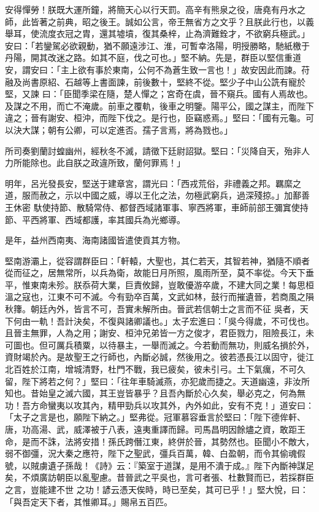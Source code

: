 \begin{pinyinscope}
 安得憚勞！朕既大運所鐘，將簡天心以行天罰。高辛有熊泉之役，唐堯有丹水之師，此皆著之前典，昭之後王。誠如公言，帝王無省方之文乎？且朕此行也，以義舉耳，使流度衣冠之胄，還其墟墳，復其桑梓，止為濟難銓才，不欲窮兵極武。」安曰：「若鑾駕必欲親動，猶不願遠涉江、淮，可暫幸洛陽，明授勝略，馳紙檄于丹陽，開其改迷之路。如其不庭，伐之可也。」堅不納。先是，群臣以堅信重道安，謂安曰：「主上欲有事於東南，公何不為蒼生致一言也！」故安因此而諫。苻融及尚書原紹、石越等上書面諫，前後數十，堅終不從。堅少子中山公詵有寵於堅，又諫
 曰：「臣聞季梁在隨，楚人憚之；宮奇在虞，晉不窺兵。國有人焉故也。及謀之不用，而亡不淹歲。前車之覆軌，後車之明鑒。陽平公，國之謀主，而陛下違之；晉有謝安、桓沖，而陛下伐之。是行也，臣竊惑焉。」堅曰：「國有元龜。可以決大謀；朝有公卿，可以定進否。孺子言焉，將為戮也。」



 所司奏劉蘭討蝗幽州，經秋冬不滅，請徵下廷尉詔獄。堅曰：「災降自天，殆非人力所能除也。此自朕之政違所致，蘭何罪焉！」



 明年，呂光發長安，堅送于建章宮，謂光曰：「西戎荒俗，非禮義之邦。羈縻之道，服而赦之，示以中國之威，導以王化之法，勿極武窮兵，過深殘掠。」加鄯善王休密
 馱使持節、散騎常侍、都督西域諸軍事、寧西將軍，車師前部王彌窴使持節、平西將軍、西域都護，率其國兵為光鄉導。



 是年，益州西南夷、海南諸國皆遣使貢其方物。



 堅南游灞上，從容謂群臣曰：「軒轅，大聖也，其仁若天，其智若神，猶隨不順者從而征之，居無常所，以兵為衛，故能日月所照，風雨所至，莫不率從。今天下垂平，惟東南未殄。朕忝荷大業，巨責攸歸，豈敢優游卒歲，不建大同之業！每思桓溫之寇也，江東不可不滅。今有勁卒百萬，文武如林，鼓行而摧遺晉，若商風之隕秋籜。朝廷內外，皆言不可，吾實未解所由。晉武若信朝士之言而不征
 吳者，天下何由一軌！吾計決矣，不復與諸卿議也。」太子宏進曰：「吳今得歲，不可伐也。且晉主無罪，人為之用；謝安、桓沖兄弟皆一方之俊才，君臣戮力，阻險長江，未可圖也。但可厲兵積粟，以待暴主，一舉而滅之。今若動而無功，則威名損於外，資財竭於內。是故聖王之行師也，內斷必誠，然後用之。彼若憑長江以固守，徙江北百姓於江南，增城清野，杜門不戰，我已疲矣，彼未引弓。土下氣癘，不可久留，陛下將若之何？」堅曰：「往年車騎滅燕，亦犯歲而捷之。天道幽遠，非汝所知也。昔始皇之滅六國，其王豈皆暴乎？且吾內斷於心久矣，舉必克之，何為無
 功！吾方命蠻夷以攻其內，精甲勁兵以攻其外，內外如此，安有不克！」道安曰：「太子之言是也，願陛下納之。」堅弗從。冠軍慕容垂言於堅曰：「陛下德侔軒、唐，功高湯、武，威澤被于八表，遠夷重譯而歸。司馬昌明因餘燼之資，敢距王命，是而不誅，法將安措！孫氏跨僭江東，終併於晉，其勢然也。臣聞小不敵大，弱不御彊，況大秦之應符，陛下之聖武，彊兵百萬，韓、白盈朝，而令其偷魂假號，以賊虜遺子孫哉！《詩》云：『築室于道謀，是用不潰于成。』陛下內斷神謀足矣，不煩廣訪朝臣以亂聖慮。昔晉武之平吳也，言可者張、杜數賢而已，若採群臣之言，豈能建不世
 之功！諺云憑天俟時，時已至矣，其可已乎！」堅大悅，曰：「與吾定天下者，其惟卿耳。」賜帛五百匹。




\end{pinyinscope}

